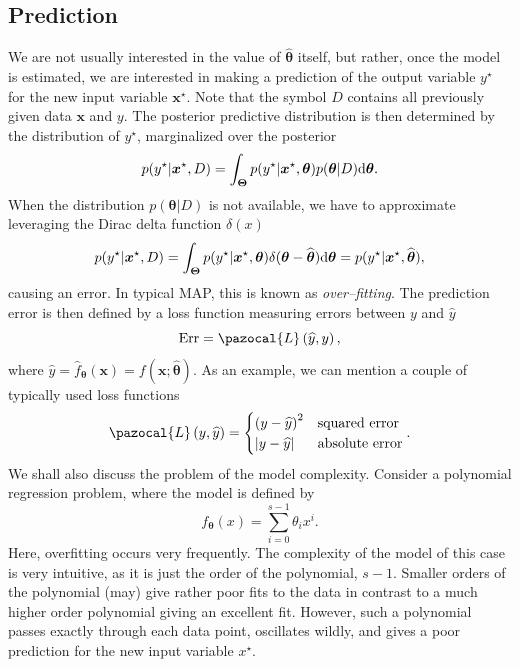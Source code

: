 \subsection{Prediction}
We are not usually interested in the value of $\widehat{\boldsymbol{\theta}}$ itself, but rather, once the model is estimated, we are interested in making a prediction of the output variable $y^{\star}$ for the new input variable $\boldsymbol{x}^{\star}$. Note that the symbol $D$ contains all previously given data $\boldsymbol{x}$ and $y$. The posterior predictive distribution is then determined by the distribution of $y^{\star}$, marginalized over the posterior
\begin{equation}
	p(y^{\star} | \boldsymbol{x}^{\star}, D) =   \int_{\boldsymbol{\Theta}} p(y^{\star}|\boldsymbol{x}^{\star}, \boldsymbol{\theta}) p(\boldsymbol{\theta}|D) \mathrm{d}\boldsymbol{\theta}.
\end{equation} 
When the distribution $p(\boldsymbol{\theta}|D)$ is not available, we have to approximate leveraging the Dirac delta function $\delta(x)$  
\begin{equation}
p(y^{\star} | \boldsymbol{x}^{\star}, D) = \int_{\boldsymbol{\Theta}} 	p(y^{\star}|\boldsymbol{x}^{\star}, \boldsymbol{\theta}) \delta(\boldsymbol{\theta} - \widehat{\boldsymbol{\theta}})\mathrm{d}\boldsymbol{\theta} = p(y^{\star}|\boldsymbol{x}^{\star}, \widehat{\boldsymbol{\theta}}),
\end{equation}
causing an error. In typical MAP, this is known as \emph{over--fitting}. The prediction error is then defined by a loss function measuring errors between $y$ and $\widehat{y}$
\begin{equation}
	\mathrm{Err} = \pazocal{L}\left(\widehat{y}, y \right),
\end{equation}	
where $\widehat{y} = \widehat{f}_{\boldsymbol{\theta}}\left(\boldsymbol{x}\right) = f(\boldsymbol{x}; \widehat{\boldsymbol{\theta}})$.  As an example, we can mention a couple of typically used loss functions 
\begin{equation}
\pazocal{L}\left(y,\widehat{y} \right) =
 \begin{cases}
	 \left(y - \widehat{y}\right)^2& \text{squared error}\\
	 \abs{y - \widehat{y}} & \text{absolute error}\\
\end{cases}   .
\end{equation}
We shall also discuss the problem of the model complexity. Consider a polynomial regression problem,  where the model is defined by
\begin{equation}
	f_{\boldsymbol{\theta}}(x) = \sum_{i=0}^{s-1}\theta_ix^i.
\end{equation}
 Here, overfitting occurs very frequently. The complexity of the model of this case is very intuitive, as it is just the order of the polynomial, $s-1$.  Smaller orders of the polynomial (may) give rather poor fits to the data in contrast to a much higher order polynomial giving an excellent fit. However, such a polynomial passes exactly through each data point, oscillates wildly, and gives a poor prediction for the new input variable $x^{\star}$. 
 
